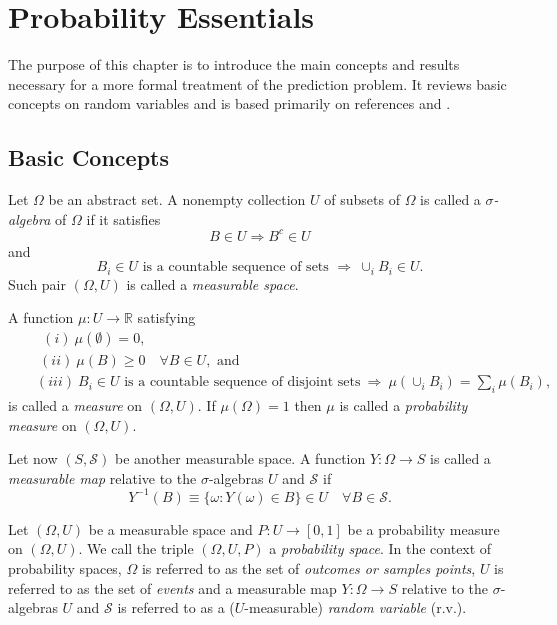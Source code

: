 \chapter{Probability Essentials}\label{ch-prob}
\thispagestyle{headings}

The purpose of this chapter is to introduce the main concepts and results necessary for
a more formal treatment of the prediction problem.
It reviews basic concepts on random variables and
is based primarily on references \cite{Du05} and \cite{JaPr04}.

\section{Basic Concepts}\label{subsc-intro-prelim-basic}

Let $\Omega$ be an abstract set. A nonempty collection $U$ of subsets of $\Omega$ is called a {\it $\sigma$-algebra} of $\Omega$ if it satisfies
\begin{equation*}
B\in U \Rightarrow B^c\in U
\end{equation*}
and
\begin{equation*}
B_i\in U\text{ is a countable sequence of sets }\Rightarrow~\cup_iB_i\in U.
\end{equation*}
Such pair $(\Omega,U)$ is called a {\it measurable space}.

A function $\mu:U\rightarrow\mathbb{R}$ satisfying
\begin{eqnarray*}
 & & ~~(i)~\mu(\emptyset) = 0, \\
 & & ~(ii)~\mu(B)\geqslant 0\quad\forall B\in U,\text{ and} \\
 & & (iii)~B_i\in U\text{ is a countable sequence of disjoint sets}~\Rightarrow~\mu(\cup_iB_i)=\sum_i \mu(B_i),
\end{eqnarray*}
is called a {\it measure} on $(\Omega,U)$. If $\mu(\Omega)=1$ then $\mu$ is called a {\it probability measure} on $(\Omega,U)$.

Let now $(S,\mathcal{S})$ be another measurable space.
A function $Y:\Omega\rightarrow S$ is called a {\it measurable map} relative to the $\sigma$-algebras $U$ and $\mathcal{S}$ if
\begin{equation*}
Y^{-1}(B)\equiv\{\omega: Y(\omega)\in B\}\in U\quad\forall B\in\mathcal{S}.
\end{equation*}

Let $(\Omega,U)$ be a measurable space and $P:U\rightarrow [0,1]$ be a probability measure on $(\Omega,U)$.
We call the triple $(\Omega,U,P)$ a {\it probability space}.
In the context of probability spaces,
$\Omega$ is referred to as the set of {\it outcomes or samples points},
$U$ is referred to as the set of {\it events} and
a measurable map $Y:\Omega\rightarrow S$ relative to the $\sigma$-algebras $U$ and $\mathcal{S}$ is referred to as a ($U$-measurable) {\it random variable} (r.v.).

